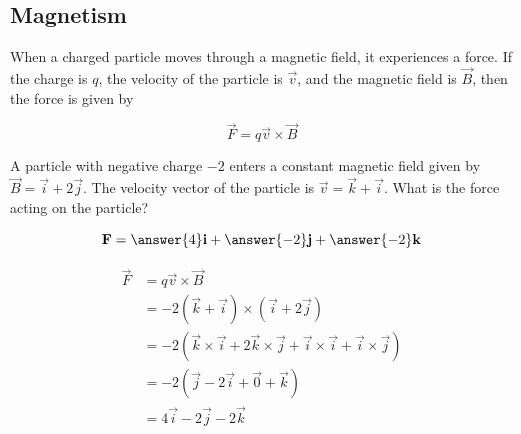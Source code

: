 \documentclass{ximera}
\begin{document}
\subsection{Magnetism} 

When a charged particle moves through a magnetic field, it experiences a force.  If the charge is $q$, the velocity of the particle is $\vec{v}$, and the magnetic field is $\vec{B}$, then the force is given by

\[
\vec{F} = q\vec{v} \times \vec{B}
\]

\begin{question}
	A particle with negative charge $-2$ enters a constant magnetic field given by $\vec{B} = \vec{i}+2\vec{j}$.  The velocity vector of the particle is  $\vec{v} = \vec{k}+\vec{i}$.  What is the force acting on the particle?
	
	\[
	\vec{F} = \answer{4}\vec{i}+\answer{-2}\vec{j}+\answer{-2}\vec{k}
	\]
	
	\begin{hint}
		\begin{align*}
			\vec{F} &= q\vec{v} \times \vec{B}\\
				&= -2 ( \vec{k}+\vec{i}) \times (\vec{i}+2\vec{j})\\
				&=-2( \vec{k} \times \vec{i}+2\vec{k} \times \vec{j}+\vec{i} \times \vec{i}+\vec{i} \times \vec{j})\\
				&=-2(\vec{j}-2\vec{i}+\vec{0}+\vec{k})\\
				&=4\vec{i}-2\vec{j}-2\vec{k}
		\end{align*}
	\end{hint}
\end{question}

	
\end{document}
